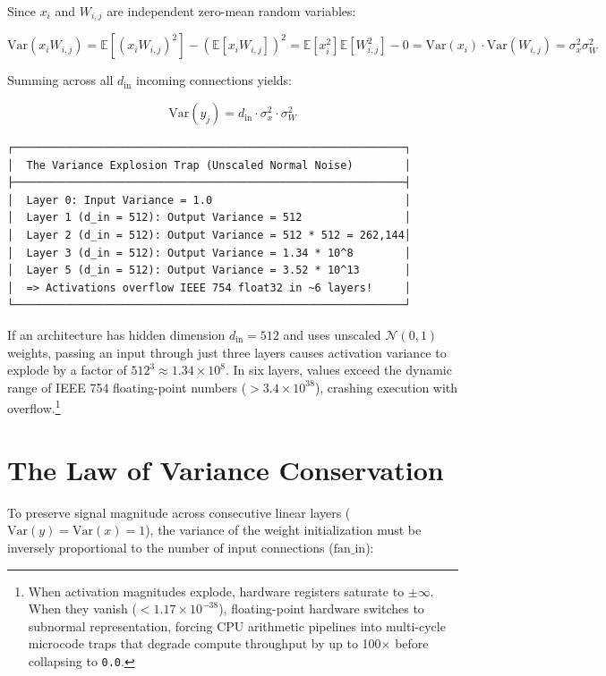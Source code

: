 \documentclass[
  letterpaper,
]{scrbook}
\begin{document}
Since \(x_i\) and \(W_{i, j}\) are independent zero-mean random
variables:

\[\text{Var}(x_i W_{i, j}) = \mathbb{E}[(x_i W_{i, j})^2] - (\mathbb{E}[x_i W_{i, j}])^2 = \mathbb{E}[x_i^2]\mathbb{E}[W_{i, j}^2] - 0 = \text{Var}(x_i) \cdot \text{Var}(W_{i, j}) = \sigma_x^2 \sigma_W^2\]

Summing across all \(d_{\text{in}}\) incoming connections yields:

\[\text{Var}(y_j) = d_{\text{in}} \cdot \sigma_x^2 \cdot \sigma_W^2\]

\begin{verbatim}
┌─────────────────────────────────────────────────────────────┐
│  The Variance Explosion Trap (Unscaled Normal Noise)        │
├─────────────────────────────────────────────────────────────┤
│  Layer 0: Input Variance = 1.0                              │
│  Layer 1 (d_in = 512): Output Variance = 512                │
│  Layer 2 (d_in = 512): Output Variance = 512 * 512 = 262,144│
│  Layer 3 (d_in = 512): Output Variance = 1.34 * 10^8        │
│  Layer 5 (d_in = 512): Output Variance = 3.52 * 10^13       │
│  => Activations overflow IEEE 754 float32 in ~6 layers!     │
└─────────────────────────────────────────────────────────────┘
\end{verbatim}

If an architecture has hidden dimension \(d_{\text{in}} = 512\) and uses
unscaled \(\mathcal{N}(0, 1)\) weights, passing an input through just
three layers causes activation variance to explode by a factor of
\(512^3 \approx 1.34 \times 10^8\). In six layers, values exceed the
dynamic range of IEEE 754 floating-point numbers
(\(> 3.4 \times 10^{38}\)), crashing execution with overflow.\footnote{When
  activation magnitudes explode, hardware registers saturate to
  \(\pm \infty\). When they vanish (\(< 1.17 \times 10^{-38}\)),
  floating-point hardware switches to subnormal representation, forcing
  CPU arithmetic pipelines into multi-cycle microcode traps that degrade
  compute throughput by up to 100× before collapsing to \texttt{0.0}.}

\section{The Law of Variance
Conservation}\label{the-law-of-variance-conservation}

To preserve signal magnitude across consecutive linear layers
(\(\text{Var}(y) = \text{Var}(x) = 1\)), the variance of the weight
initialization must be inversely proportional to the number of input
connections (\(\text{fan\_in}\)):
\end{document}
